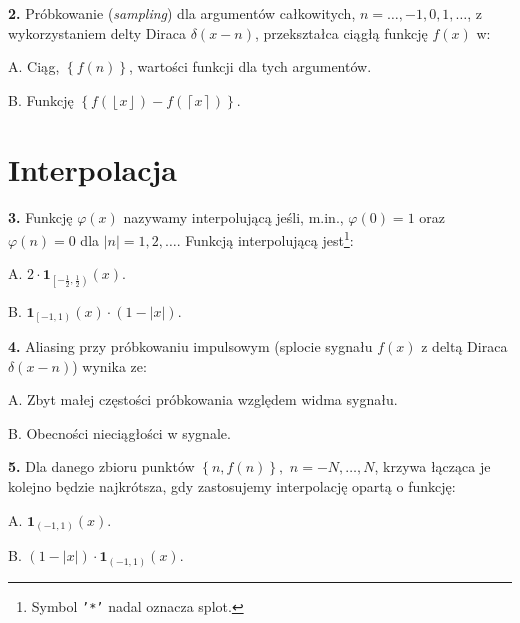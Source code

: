 \documentclass[journal,9pt,final,a4paper]{IEEEtran}%
\providecommand{\U}[1]{\protect\rule{.1in}{.1in}}
\begin{document}
\vspace*{0.25in}\textbf{2. }Pr\'{o}bkowanie (\emph{sampling}) dla
argument\'{o}w ca\l kowitych, $n=\ldots,-1,0,1,\ldots$, z wykorzystaniem delty
Diraca $\delta\left(  x-n\right)  $, przekszta\l ca ci\k{a}g\l \k{a}
funkcj\k{e} $f\left(  x\right)  $ w:

A. Ci\k{a}g, $\left\{  f\left(  n\right)  \right\}  $, warto\'{s}ci funkcji
dla tych argument\'{o}w.

B. Funkcj\k{e} $\left\{  f\left(  \left\lfloor x\right\rfloor \right)
-f\left(  \left\lceil x\right\rceil \right)  \right\}  $.

\section{Interpolacja}

\textbf{3. }Funkcj\k{e} $\varphi\left(  x\right)  $ nazywamy
interpoluj\k{a}c\k{a} je\'{s}li, m.in., $\varphi\left(  0\right)  =1$ oraz
$\varphi\left(  n\right)  =0$ dla $\left\vert n\right\vert =1,2,\ldots$.
Funkcj\k{a} interpoluj\k{a}c\k{a} jest\footnote{Symbol \texttt{'*'} nadal
oznacza splot.}:

A. $2\cdot\mathbf{1}_{\left[  -%
\frac12
,%
\frac12
\right)  }\left(  x\right)  .$

B. $\mathbf{1}_{\left[  -1,1\right)  }\left(  x\right)  \cdot\left(
1-\left\vert x\right\vert \right)  .$

\vspace*{0.25in}\textbf{4. }Aliasing przy pr\'{o}bkowaniu impulsowym (splocie
sygna\l u $f\left(  x\right)  $ z delt\k{a} Diraca $\delta\left(  x-n\right)  $)
wynika ze:

A. Zbyt ma\l ej cz\k{e}sto\'{s}ci pr\'{o}bkowania wzgl\k{e}dem widma sygna\l u.

B. Obecno\'{s}ci nieci\k{a}g\l o\'{s}ci w sygnale.

\vspace*{0.25in}\textbf{5. }Dla danego zbioru punkt\'{o}w $\left\{  n,f\left(
n\right)  \right\}  ,$ $n=-N,\ldots,N$, krzywa \l \k{a}cz\k{a}ca je kolejno
b\k{e}dzie najkr\'{o}tsza, gdy zastosujemy interpolacj\k{e} opart\k{a} o funkcj\k{e}:

A. $\mathbf{1}_{\left(  -1,1\right)  }\left(  x\right)  .$

B. $\left(  1-\left\vert x\right\vert \right)  \cdot\mathbf{1}_{\left(
-1,1\right)  }\left(  x\right)  .$
\end{document}

